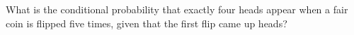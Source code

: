\documentclass[../main.tex]{subfiles}
\begin{document}
What is the conditional probability that exactly four heads appear when a fair coin is flipped five times, given that the first flip came up heads?

\solution
\end{document}
